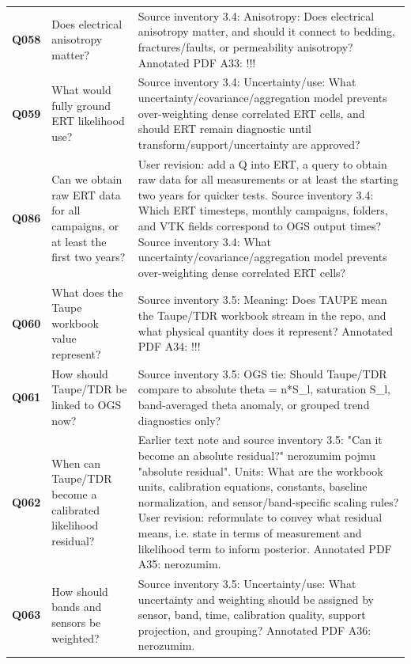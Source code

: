\begin{longtable}{@{}L{0.10\textwidth} L{0.30\textwidth} L{0.52\textwidth}@{}}
\addlinespace[0.22em]
\textbf{Q058} & Does electrical anisotropy matter? & Source inventory 3.4: Anisotropy: Does electrical anisotropy matter, and should it connect to bedding, fractures/faults, or permeability anisotropy? Annotated PDF A33: !!!\\
\addlinespace[0.22em]
\textbf{Q059} & What would fully ground ERT likelihood use? & Source inventory 3.4: Uncertainty/use: What uncertainty/covariance/aggregation model prevents over-weighting dense correlated ERT cells, and should ERT remain diagnostic until transform/support/uncertainty are approved?\\
\addlinespace[0.22em]
\textbf{Q086} & Can we obtain raw ERT data for all campaigns, or at least the first two years? & User revision: add a Q into ERT, a query to obtain raw data for all measurements or at least the starting two years for quicker tests. Source inventory 3.4: Which ERT timesteps, monthly campaigns, folders, and VTK fields correspond to OGS output times? Source inventory 3.4: What uncertainty/covariance/aggregation model prevents over-weighting dense correlated ERT cells?\\
\addlinespace[0.22em]
\textbf{Q060} & What does the Taupe workbook value represent? & Source inventory 3.5: Meaning: Does TAUPE mean the Taupe/TDR workbook stream in the repo, and what physical quantity does it represent? Annotated PDF A34: !!!\\
\addlinespace[0.22em]
\textbf{Q061} & How should Taupe/TDR be linked to OGS now? & Source inventory 3.5: OGS tie: Should Taupe/TDR compare to absolute theta = n*S\_l, saturation S\_l, band-averaged theta anomaly, or grouped trend diagnostics only?\\
\addlinespace[0.22em]
\textbf{Q062} & When can Taupe/TDR become a calibrated likelihood residual? & Earlier text note and source inventory 3.5: "Can it become an absolute residual?" nerozumim pojmu "absolute residual". Units: What are the workbook units, calibration equations, constants, baseline normalization, and sensor/band-specific scaling rules? User revision: reformulate to convey what residual means, i.e. state in terms of measurement and likelihood term to inform posterior. Annotated PDF A35: nerozumim.\\
\addlinespace[0.22em]
\textbf{Q063} & How should bands and sensors be weighted? & Source inventory 3.5: Uncertainty/use: What uncertainty and weighting should be assigned by sensor, band, time, calibration quality, support projection, and grouping? Annotated PDF A36: nerozumim.\\

\end{longtable}
